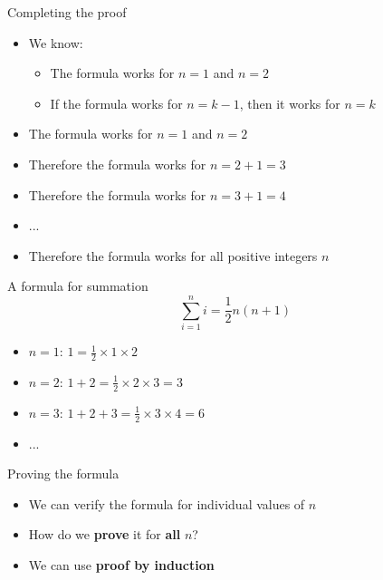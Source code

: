 \begin{frame}{Completing the proof}
    \begin{itemize}
        \pause\item We know:
            \begin{itemize}
                \pause\item The formula works for $n=1$ and $n=2$
                \pause\item If the formula works for $n=k-1$, then it works for $n=k$
            \end{itemize}
        \pause\item The formula works for $n=1$ and $n=2$
        \pause\item Therefore the formula works for $n=2+1=3$
        \pause\item Therefore the formula works for $n=3+1=4$
        \pause\item ...
        \pause\item Therefore the formula works for all positive integers $n$
    \end{itemize}
\end{frame}

\begin{frame}{A formula for summation}
$$ \sum_{i=1}^n i = \frac12 n (n+1) $$
\pause
\begin{itemize}
	\pause\item $n=1$: $1 = \frac12 \times 1 \times 2$
	\pause\item $n=2$: $1+2 = \frac12 \times 2 \times 3 = 3$
	\pause\item $n=3$: $1+2+3 = \frac12 \times 3 \times 4 = 6$
	\pause\item ...
\end{itemize}
\end{frame}

\begin{frame}{Proving the formula}
\begin{itemize}
	\pause\item We can verify the formula for individual values of $n$
	\pause\item How do we \textbf{prove} it for \textbf{all} $n$?
	\pause\item We can use \textbf{proof by induction}
\end{itemize}
\end{frame}

